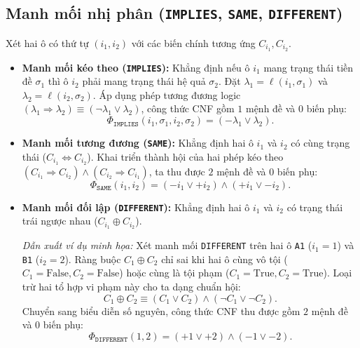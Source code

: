 \subsection{Manh mối nhị phân (\texttt{IMPLIES}, \texttt{SAME}, \texttt{DIFFERENT})}
Xét hai ô có thứ tự $(i_1, i_2)$ với các biến chính tương ứng $C_{i_1}, C_{i_2}$.

\begin{itemize}
    \item \textbf{Manh mối kéo theo (\texttt{IMPLIES}):} Khẳng định nếu ô $i_1$ mang trạng thái tiền đề $\sigma_1$ thì ô $i_2$ phải mang trạng thái hệ quả $\sigma_2$. Đặt $\lambda_1 = \ell(i_1, \sigma_1)$ và $\lambda_2 = \ell(i_2, \sigma_2)$. Áp dụng phép tương đương logic $(\lambda_1 \Rightarrow \lambda_2) \equiv (\neg \lambda_1 \lor \lambda_2)$, công thức CNF gồm $1$ mệnh đề và $0$ biến phụ:
    \begin{equation}
        \Phi_{\texttt{IMPLIES}}(i_1, \sigma_1, i_2, \sigma_2) = (-\lambda_1 \lor \lambda_2).
    \end{equation}

    \item \textbf{Manh mối tương đương (\texttt{SAME}):} Khẳng định hai ô $i_1$ và $i_2$ có cùng trạng thái ($C_{i_1} \Leftrightarrow C_{i_2}$). Khai triển thành hội của hai phép kéo theo $(C_{i_1} \Rightarrow C_{i_2}) \land (C_{i_2} \Rightarrow C_{i_1})$, ta thu được $2$ mệnh đề và $0$ biến phụ:
    \begin{equation}
        \Phi_{\texttt{SAME}}(i_1, i_2) = (-i_1 \lor +i_2) \land (+i_1 \lor -i_2).
    \end{equation}

    \item \textbf{Manh mối đối lập (\texttt{DIFFERENT}):} Khẳng định hai ô $i_1$ và $i_2$ có trạng thái trái ngược nhau ($C_{i_1} \oplus C_{i_2}$).
    
    \textit{Dẫn xuất ví dụ minh họa:} Xét manh mối \texttt{DIFFERENT} trên hai ô \texttt{A1} ($i_1 = 1$) và \texttt{B1} ($i_2 = 2$). Ràng buộc $C_1 \oplus C_2$ chỉ sai khi hai ô cùng vô tội ($C_1 = \text{False}, C_2 = \text{False}$) hoặc cùng là tội phạm ($C_1 = \text{True}, C_2 = \text{True}$). Loại trừ hai tổ hợp vi phạm này cho ta dạng chuẩn hội:
    \begin{equation}
        C_1 \oplus C_2 \equiv (C_1 \lor C_2) \land (\neg C_1 \lor \neg C_2).
    \end{equation}
    Chuyển sang biểu diễn số nguyên, công thức CNF thu được gồm $2$ mệnh đề và $0$ biến phụ:
    \begin{equation}
        \Phi_{\texttt{DIFFERENT}}(1, 2) = (+1 \lor +2) \land (-1 \lor -2).
    \end{equation}
\end{itemize}

